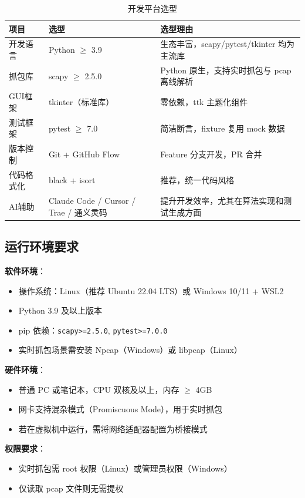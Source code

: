 \documentclass[12pt,a4paper]{ctexart}
\begin{document}
\begin{table}[H]
\centering
\caption{开发平台选型}
\small
\begin{tabular}{@{}llp{6.5cm}@{}}
\toprule
项目 & 选型 & 选型理由 \\
\midrule
开发语言   & Python $\ge$ 3.9        & 生态丰富，scapy/pytest/tkinter 均为主流库 \\
抓包库     & scapy $\ge$ 2.5.0       & Python 原生，支持实时抓包与 pcap 离线解析 \\
GUI框架    & tkinter（标准库）        & 零依赖，ttk 主题化组件 \\
测试框架   & pytest $\ge$ 7.0        & 简洁断言，fixture 复用 mock 数据 \\
版本控制   & Git + GitHub Flow       & Feature 分支开发，PR 合并 \\
代码格式化 & black + isort           & 推荐，统一代码风格 \\
AI辅助     & Claude Code / Cursor / Trae / 通义灵码 & 提升开发效率，尤其在算法实现和测试生成方面 \\
\bottomrule
\end{tabular}
\end{table}

\subsection{运行环境要求}

\textbf{软件环境}：
\begin{itemize}[nosep]
    \item 操作系统：Linux（推荐 Ubuntu 22.04 LTS）或 Windows 10/11 + WSL2
    \item Python 3.9 及以上版本
    \item pip 依赖：\texttt{scapy>=2.5.0}, \texttt{pytest>=7.0.0}
    \item 实时抓包场景需安装 Npcap（Windows）或 libpcap（Linux）
\end{itemize}

\textbf{硬件环境}：
\begin{itemize}[nosep]
    \item 普通 PC 或笔记本，CPU 双核及以上，内存 $\ge$ 4GB
    \item 网卡支持混杂模式（Promiscuous Mode），用于实时抓包
    \item 若在虚拟机中运行，需将网络适配器配置为桥接模式
\end{itemize}

\textbf{权限要求}：
\begin{itemize}[nosep]
    \item 实时抓包需 root 权限（Linux）或管理员权限（Windows）
    \item 仅读取 pcap 文件则无需提权
\end{itemize}
\end{document}
